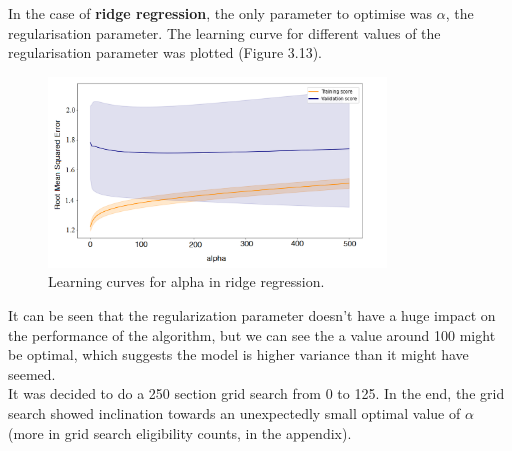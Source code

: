 In the case of \textbf{ridge regression}, the only parameter to optimise was $\alpha$, the regularisation parameter. The learning curve for different values of the regularisation parameter  was plotted (Figure 3.13).

\begin{figure}[h!]
    \centering
    \includegraphics[width=0.8\textwidth]{Images/Results/Hyperparameter/alphalc.png}
    \caption{Learning curves for alpha in ridge regression.}
\end{figure}
It can be seen that the regularization parameter doesn't have a huge impact on the performance of the algorithm, but we can see the a value around 100 might be optimal, which suggests the model is higher variance than it might have seemed.\\

It was decided to do a 250 section grid search from 0 to 125. In the end, the grid search showed inclination towards an unexpectedly small optimal value of $\alpha$ (more in grid search eligibility counts, in the appendix).\\\\

